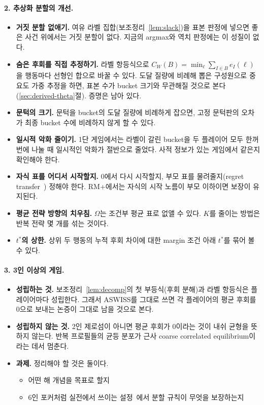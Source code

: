 \paragraph{2. 추상화 분할의 개선.}
\begin{itemize}
  \item \textbf{거짓 분할 없애기.} 여유 라벨 집합(보조정리~\ref{lem:slack})을 표본 판정에 넣으면 좋은 사건 위에서는 거짓 분할이 없다. 지금의 argmax와 역치 판정에는 이 성질이 없다.
  \item \textbf{숨은 후회를 직접 추정하기.} 라벨 항등식으로 $C_W(B)=\min_\ell\sum_{I\in B}e_I(\ell)$을 행동마다 선형인 합으로 바꿀 수 있다. 도달 질량에 비례해 뽑은 구성원으로 중요도 가중 추정을 하면, 표본 수가 bucket 크기와 무관해질 것으로 본다(\ref{sec:derived-theta}절). 증명은 남아 있다.
  \item \textbf{문턱의 크기.} 문턱을 bucket의 도달 질량에 비례하게 잡으면, 고정 문턱판의 오차가 최종 bucket 수에 비례하지 않게 할 수 있다.
  \item \textbf{일시적 악화 줄이기.} 1단 게임에서는 라벨이 갈린 bucket을 두 플레이어 모두 한꺼번에 나눌 때 일시적인 악화가 절반으로 줄었다. 사적 정보가 있는 게임에서 같은지 확인해야 한다.
  \item \textbf{자식 표를 어디서 시작할지.} 0에서 다시 시작할지, 부모 표를 물려줄지(regret transfer~\citep{brown2014regret}) 정해야 한다. RM+에서는 자식의 시작 노름이 부모 이하이면 보장이 유지된다.
  \item \textbf{평균 전략 방향의 치우침.} $\Omega$는 조건부 평균 표로 없앨 수 있다. $K$를 줄이는 방법은 반복 전략 몇 개를 섞는 것이다.
  \item \textbf{$t^*$의 상한.} 상위 두 행동의 누적 후회 차이에 대한 margin 조건 아래 $t^*$를 묶어 볼 수 있다.
\end{itemize}

\paragraph{3. 3인 이상의 게임.}
\begin{itemize}
  \item \textbf{성립하는 것.} 보조정리~\ref{lem:decomp}의 첫 부등식(후회 분해)과 라벨 항등식은 플레이어마다 성립한다. 그래서 ASWISS를 그대로 쓰면 각 플레이어의 평균 후회를 0으로 보내는 논증이 그대로 남을 것으로 본다.
  \item \textbf{성립하지 않는 것.} 2인 제로섬이 아니면 평균 후회가 0이라는 것이 내쉬 균형을 뜻하지 않는다. 반복 프로필들의 균등 분포가 근사 coarse correlated equilibrium이라는 데서 멈춘다.
  \item \textbf{과제.} 정리해야 할 것은 둘이다.
    \begin{itemize}
      \item 어떤 해 개념을 목표로 할지
      \item 6인 포커처럼 실전에서 쓰이는 설정~\citep{brown2019superhuman}에서 분할 규칙이 무엇을 보장하는지
    \end{itemize}
\end{itemize}

